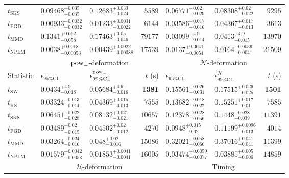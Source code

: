 \begin{tabular}{l|llr|llr}
	$t_{\mathrm{SKS}}$ & $0.09468_{-0.035}^{+0.035}$ & $0.12683_{-0.024}^{+0.033}$ & $5589$ & $0.06771_{-0.029}^{+0.02}$ & $0.08308_{-0.022}^{+0.02}$ & $9295$ \\
	$t_{\mathrm{FGD}}$ & ${\mathbf{0.00933_{-0.0032}^{+0.0032}}}$ & ${\mathbf{0.01233_{-0.0022}^{+0.0031}}}$ & $6144$ & $0.03586_{-0.016}^{+0.017}$ & $0.04367_{-0.013}^{+0.017}$ & $3613$ \\
	$t_{\mathrm{MMD}}$ & $0.1341_{-0.058}^{+0.062}$ & $0.17463_{-0.046}^{+0.05}$ & $79177$ & ${\mathbf{0.03099_{-0.014}^{+4.9}}}$ & ${\mathbf{0.0413_{-0.015}^{+4.9}}}$ & $13970$ \\
\rowcolor{red!35}	$t_{\mathrm{NPLM}}$ & $0.0038_{-0.00053}^{+0.0018}$ & $0.00439_{-0.00088}^{+0.0022}$ & $17539$ & $0.0137_{-0.0054}^{+0.0041}$ & $0.0164_{-0.0041}^{+0.0036}$ & $21509$ \\
	\toprule
	\multicolumn{1}{c}{} & \multicolumn{3}{c}{$\rm{pow}_{-}$-deformation} & \multicolumn{3}{c}{$\mathcal{N}$-deformation} \\
	Statistic & $\epsilon_{95\%\mathrm{CL}}$ & $\epsilon^  {\rm{pow}_{-}}_{99\%\mathrm{CL}}$ & $t$ (s) & $\epsilon_{95\%\mathrm{CL}}$ & $\epsilon^    {\mathcal{N}}_{99\%\mathrm{CL}}$ & $t$ (s) \\
	\midrule
	$t_{\mathrm{SW}}$ & $0.0434_{-0.018}^{+4.9}$ & $0.05684_{-0.016}^{+4.9}$ & ${\mathbf{1381}}$ & $0.15561_{-0.031}^{+0.026}$ & $0.17515_{-0.025}^{+0.026}$ & ${\mathbf{1501}}$ \\
	$t_{\overline{\mathrm{KS}}}$ & $0.03324_{-0.014}^{+0.013}$ & ${\mathbf{0.04369_{-0.013}^{+0.015}}}$ & $7555$ & $0.13682_{-0.027}^{+0.018}$ & $0.15251_{-0.01}^{+0.017}$ & $7585$ \\
	$t_{\mathrm{SKS}}$ & $0.06451_{-0.028}^{+0.022}$ & $0.08132_{-0.021}^{+0.021}$ & $10657$ & $0.12378_{-0.056}^{+0.028}$ & $0.1448_{-0.039}^{+0.028}$ & $11391$ \\
	$t_{\mathrm{FGD}}$ & $0.03489_{-0.015}^{+0.02}$ & $0.04502_{-0.012}^{+0.02}$ & $4270$ & ${\mathbf{0.0948_{-0.02}^{+0.015}}}$ & ${\mathbf{0.11199_{-0.013}^{+0.0096}}}$ & $4014$ \\
	$t_{\mathrm{MMD}}$ & ${\mathbf{0.03264_{-0.016}^{+0.024}}}$ & $0.048_{-0.016}^{+0.02}$ & $15086$ & $0.32021_{-0.066}^{+0.058}$ & $0.37016_{-0.041}^{+0.041}$ & $11399$ \\
\rowcolor{red!35}	$t_{\mathrm{NPLM}}$ & $0.01579_{-0.0058}^{+0.0042}$ & $0.01853_{-0.0041}^{+0.0041}$ & $16005$ & $0.03474_{-0.0077}^{+0.0059}$ & $0.03885_{-0.006}^{+0.005}$ & $14859$ \\
	\toprule
	\multicolumn{1}{c}{} & \multicolumn{3}{c}{$\mathcal{U}$-deformation} & \multicolumn{3}{c}{Timing} \\

\end{tabular}
